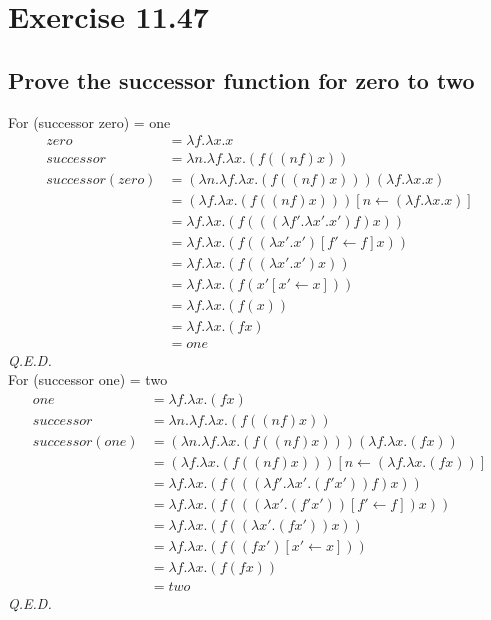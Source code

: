 \section{Exercise 11.47}
\subsection{Prove the successor function for zero to two}
For (successor zero) = one
\begin{align}
							 zero	&= \lambda f. \lambda x. x \\
					successor	&= \lambda n. \lambda f. \lambda x. (f ((n f) x)) \\
		successor(zero)	&= (\lambda n. \lambda f. \lambda x. (f ((n f) x))) (\lambda f. \lambda x. x) \\
										&= (\lambda f. \lambda x. (f ((n f) x))) [n \leftarrow (\lambda f. \lambda x. x)] \\
										&= \lambda f. \lambda x. (f (((\lambda f'. \lambda x'. x') f) x)) \\
										&= \lambda f. \lambda x. (f ((\lambda x'. x') [f' \leftarrow f] x)) \\
										&= \lambda f. \lambda x. (f ((\lambda x'. x') x)) \\
										&= \lambda f. \lambda x. (f (x' [x' \leftarrow x])) \\
										&= \lambda f. \lambda x. (f (x)) \\ 
										&= \lambda f. \lambda x. (f x) \\
										&= one
\end{align}
\emph{Q.E.D.}
\\
For (successor one) = two
\begin{align}
								one	&= \lambda f. \lambda x. (f x) \\
					successor	&= \lambda n. \lambda f. \lambda x. (f ((n f) x)) \\
		 successor(one)	&= (\lambda n. \lambda f. \lambda x. (f ((n f) x))) (\lambda f. \lambda x. (f x)) \\
										&= (\lambda f. \lambda x. (f ((n f) x))) [n \leftarrow (\lambda f. \lambda x. (f x))] \\
										&= \lambda f. \lambda x. (f (((\lambda f'. \lambda x'. (f' x')) f) x)) \\
										&= \lambda f. \lambda x. (f (((\lambda x'. (f' x')) [f' \leftarrow f]) x)) \\
										&= \lambda f. \lambda x. (f ((\lambda x'. (f x')) x)) \\
										&= \lambda f. \lambda x. (f ((f x') [x' \leftarrow x])) \\
										&= \lambda f. \lambda x. (f (f x)) \\
										&= two
\end{align}
\emph{Q.E.D.}

